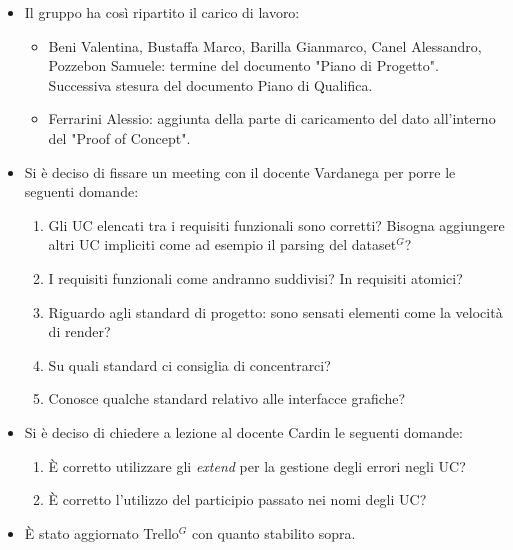 \begin{itemize}
	\item Il gruppo ha così ripartito il carico di lavoro:
	\begin{itemize}
		\item Beni Valentina, Bustaffa Marco, Barilla Gianmarco, Canel Alessandro, Pozzebon Samuele: termine del documento "Piano di Progetto". Successiva stesura del documento Piano di Qualifica. 
		\item Ferrarini Alessio: aggiunta della parte di caricamento del dato all'interno del "Proof of Concept".
	\end{itemize}
	\item Si è deciso di fissare un meeting con il docente Vardanega per porre le seguenti domande:
	\begin{enumerate}
		\item Gli UC elencati tra i requisiti funzionali sono corretti? Bisogna aggiungere altri UC impliciti come ad esempio il parsing del dataset$^{G}$?
		\item I requisiti funzionali come andranno suddivisi? In requisiti atomici?
		\item Riguardo agli standard di progetto: sono sensati elementi come la velocità di render?
		\item Su quali standard ci consiglia di concentrarci?
		\item Conosce qualche standard relativo alle interfacce grafiche?
	\end{enumerate}
	\item Si è deciso di chiedere a lezione al docente Cardin le seguenti domande:
	\begin{enumerate}
		\item È corretto utilizzare gli \textit{extend} per la gestione degli errori negli UC?
		\item È corretto l'utilizzo del participio passato nei nomi degli UC?
	\end{enumerate}
	\item È stato aggiornato Trello$^{G}$ con quanto stabilito sopra.
\end{itemize}